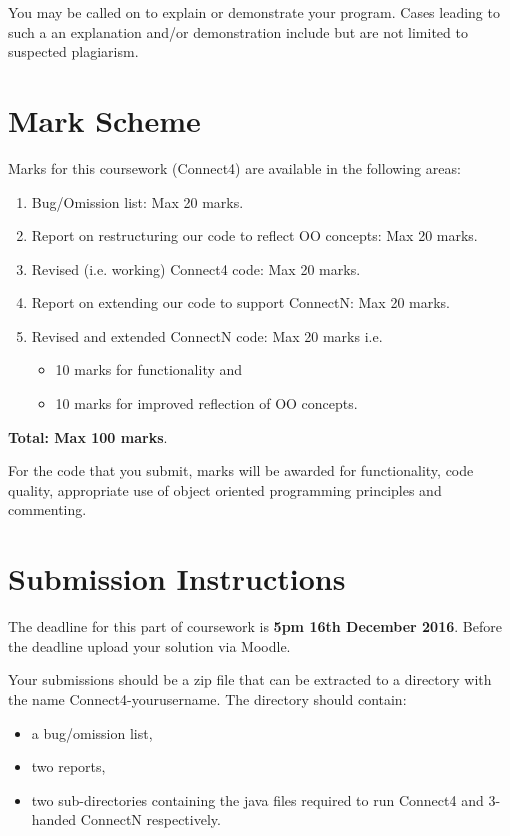 \documentclass[12pt, oneside]{article}   	%
\begin{document}
You may be called on to explain or demonstrate your program. Cases leading to such a an explanation and/or demonstration include but are not limited to suspected plagiarism.


\section{Mark Scheme}
Marks for this coursework (Connect4) are available in the following areas:
\begin{enumerate}
\item Bug/Omission list: Max 20 marks.
\item Report on restructuring our code to reflect OO concepts: Max 20 marks.
\item Revised (i.e. working) Connect4 code: Max 20 marks.
\item Report on extending our code to support ConnectN: Max 20 marks.
\item Revised and extended ConnectN code: Max 20 marks i.e.
\begin {itemize}
\item 10 marks for  functionality and 
\item 10 marks for improved reflection of OO concepts.
\end{itemize} 
\end{enumerate}

\textbf{Total: Max 100 marks}.
\bigskip

For the code that you submit, marks will be awarded for functionality, code quality, appropriate use of object oriented programming principles and commenting.


\section{Submission Instructions}
The deadline for this part of coursework is \textbf{5pm 16th December 2016}. Before the deadline upload your solution via Moodle.

Your submissions should be a zip file that can be extracted to a directory with the name Connect4-yourusername. The directory should contain:
\begin{itemize}
\item a bug/omission list,
\item two reports,
\item two sub-directories containing the java files required to run Connect4 and 3-handed ConnectN respectively.
\end{itemize}
 
\end{document}
